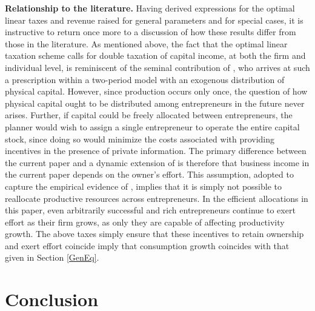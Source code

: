 \documentclass[11pt]{article}
\theoremstyle{plain}
\begin{document}
\textbf{Relationship to the literature.} Having derived expressions for the optimal linear taxes and revenue raised for general parameters and for special cases, it is instructive to return once more to a discussion of how these results differ from those in the literature. As mentioned above, the fact that the optimal linear taxation scheme calls for double taxation of capital income, at both the firm and individual level, is reminiscent of the seminal contribution of \cite{albanesi_optimal_2006}, who arrives at such a prescription within a two-period model with an exogenous distribution of physical capital. However, since production occurs only once, the question of how physical capital ought to be distributed among entrepreneurs in the future never arises. Further, if capital could be freely allocated between entrepreneurs, the planner would wish to assign a single entrepreneur to operate the entire capital stock, since doing so would minimize the costs associated with providing incentives in the presence of private information. The primary difference between the current paper and a dynamic extension of \cite{albanesi_optimal_2006} is therefore that business income in the current paper depends on the owner's effort. This assumption, adopted to capture the empirical evidence of \cite{smith_capitalists_2019}, implies that it is simply not possible to reallocate productive resources across entrepreneurs.  In the efficient allocations in this paper, even arbitrarily successful and rich entrepreneurs continue to exert effort as their firm grows, as only they are capable of affecting productivity growth. The above taxes simply ensure that these incentives to retain ownership and exert effort coincide imply that consumption growth coincides with that given in Section \ref{GenEq}. 


\section{Conclusion} \label{Conc}
\end{document}
